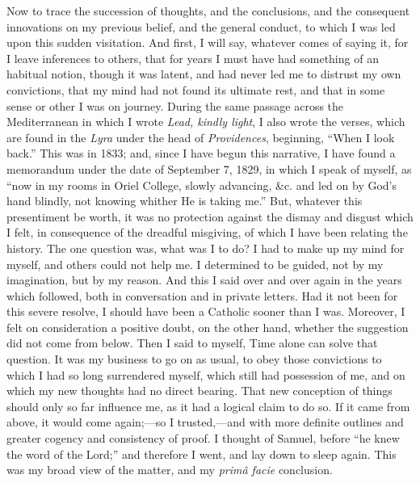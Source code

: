 Now to trace the succession of thoughts, and the conclusions, and the
consequent innovations on my previous belief, and the general conduct,
to which I was led upon this sudden visitation. And first, I will say,
whatever comes of saying it, for I leave inferences to others, that for years I must have had something of an habitual notion, though it was
latent, and had never led me to distrust my own convictions, that my
mind had not found its ultimate rest, and that in some sense or other I
was on journey. During the same passage across the Mediterranean in
which I wrote \emph{Lead, kindly light}, I also wrote the verses,
which are found in the \emph{Lyra} under the head of \emph{Providences},
beginning, ``When I look back.'' This was in 1833; and, since I
have begun this narrative, I have found a memorandum under the date of
September 7, 1829, in which I speak of myself, as ``now in my
rooms in Oriel College, slowly advancing, \&c. and led on by God's
hand blindly, not knowing whither He is taking me.'' But, whatever
this presentiment be worth, it was no protection against the dismay and
disgust which I felt, in consequence of the dreadful misgiving, of
which I have been relating the history. The one question was, what was I
to do? I had to make up my mind for myself, and others could not help
me. I determined to be guided, not by my imagination, but by my reason.
And this I said over and over again in the years which followed, both in
conversation and in private letters. Had it not been for this severe
resolve, I should have been a Catholic sooner than I was. Moreover, I
felt on consideration a positive doubt, on the other hand, whether the
suggestion did not come from below. Then I said to myself, Time alone
can solve that question. It was my business to go on as usual, to obey
those convictions to which I had so long surrendered myself, which still
had possession of me, and on which my new thoughts had no direct
bearing. That new conception of things should only so far influence me,
as it had a logical claim to do so. If it came from above, it would come
again;—so I trusted,—and with more definite outlines and greater
cogency and consistency of proof. I thought of Samuel, before
``he knew the word of the Lord;'' and therefore I went, and lay
down to sleep again. This was my broad view of the matter, and my \emph{primâ
facie} conclusion.

